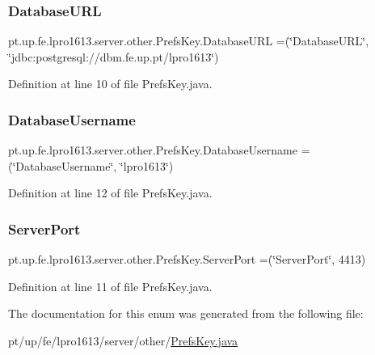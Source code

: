 \subsubsection{\texorpdfstring{Database\+U\+RL}{DatabaseURL}}
{\footnotesize\ttfamily pt.\+up.\+fe.\+lpro1613.\+server.\+other.\+Prefs\+Key.\+Database\+U\+RL =(\char`\"{}Database\+U\+RL\char`\"{}, \char`\"{}jdbc\+:postgresql\+://dbm.\+fe.\+up.\+pt/lpro1613\char`\"{})}



Definition at line 10 of file Prefs\+Key.\+java.

\hypertarget{enumpt_1_1up_1_1fe_1_1lpro1613_1_1server_1_1other_1_1_prefs_key_a1f5081d54a2b9ebb5e46de69a24b9853}{}\label{enumpt_1_1up_1_1fe_1_1lpro1613_1_1server_1_1other_1_1_prefs_key_a1f5081d54a2b9ebb5e46de69a24b9853} 
\subsubsection{\texorpdfstring{Database\+Username}{DatabaseUsername}}
{\footnotesize\ttfamily pt.\+up.\+fe.\+lpro1613.\+server.\+other.\+Prefs\+Key.\+Database\+Username =(\char`\"{}Database\+Username\char`\"{}, \char`\"{}lpro1613\char`\"{})}



Definition at line 12 of file Prefs\+Key.\+java.

\hypertarget{enumpt_1_1up_1_1fe_1_1lpro1613_1_1server_1_1other_1_1_prefs_key_a92ee06ea77e828cd8272275f9309e142}{}\label{enumpt_1_1up_1_1fe_1_1lpro1613_1_1server_1_1other_1_1_prefs_key_a92ee06ea77e828cd8272275f9309e142} 
\subsubsection{\texorpdfstring{Server\+Port}{ServerPort}}
{\footnotesize\ttfamily pt.\+up.\+fe.\+lpro1613.\+server.\+other.\+Prefs\+Key.\+Server\+Port =(\char`\"{}Server\+Port\char`\"{}, 4413)}



Definition at line 11 of file Prefs\+Key.\+java.



The documentation for this enum was generated from the following file\+:\begin{DoxyCompactItemize}
\item 
pt/up/fe/lpro1613/server/other/\hyperlink{pt_2up_2fe_2lpro1613_2server_2other_2_prefs_key_8java}{Prefs\+Key.\+java}\end{DoxyCompactItemize}
